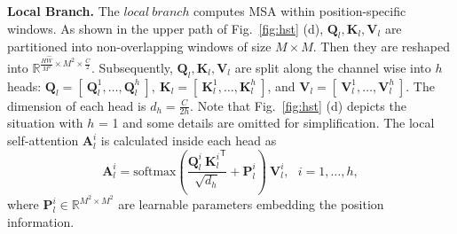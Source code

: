 \documentclass{article}
\newcommand{\tsp}{^{\mathsf{T}}}
\begin{document}
\textbf{Local Branch.} The $local~branch$ computes MSA within position-specific windows. As shown in the upper path of Fig.~\ref{fig:hst} (d), $\mathbf{Q}_l,\mathbf{K}_l,\mathbf{V}_l$ are partitioned into non-overlapping windows of size $M\times M$. Then they are reshaped into $\mathbb{R}^{\frac{H\hat{W}}{M^2}\times M^2\times \frac{C}{2}}$. Subsequently,  $\mathbf{Q}_l,\mathbf{K}_l,\mathbf{V}_l$ are split along the channel wise into $h$ heads: $\mathbf{Q}_l = [~\mathbf{Q}_{l}^1, \ldots, \mathbf{Q}_{l}^h~],~\mathbf{K}_l = [~\mathbf{K}_{l}^1, \ldots, \mathbf{K}_{l}^h~]$, and $\mathbf{V}_l = [~\mathbf{V}_{l}^1, \ldots, \mathbf{V}_{l}^h~]$. The dimension of each head is $d_h = \frac{C}{2h}$. Note that Fig.~\ref{fig:hst} (d) depicts the situation with $h$ = 1 and some details are omitted for simplification. The local self-attention $\mathbf{A}_{l}^i$ is calculated inside each head as
\begin{equation}
	\mathbf{A}_{l}^i=\text{softmax}(\frac{\mathbf{Q}_{l}^i~{\mathbf{K}_{l}^i}\tsp}{\sqrt{d_h}} + \mathbf{P}_{l}^i)~\mathbf{V}_{l}^i, ~~~ i=1, \ldots, h,
	\label{eq:attn_w}
\end{equation}
where $\mathbf{P}_{l}^i \in \mathbb{R}^{M^2 \times M^2}$ are learnable parameters embedding the position information. 
\end{document}
